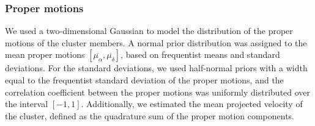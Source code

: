 \documentclass{aa}
\begin{document}
\subsubsection{Proper motions}
We used a two-dimensional Gaussian to model the distribution of the proper motions of the cluster members. A normal prior distribution was assigned to the mean proper motions $\left[\overline{\mu_\alpha},\overline{\mu_\delta}\right]$, based on frequentist means and standard deviations. For the standard deviations, we used half-normal priors with a width equal to the frequentist standard deviation of the proper motions, and the correlation coefficient between the proper motions was uniformly distributed over the interval $[-1, 1]$. Additionally, we estimated the mean projected velocity of the cluster, defined as the quadrature sum of the proper motion components.
\begin{table}
	\caption{Summary of derived parameters for NGC 6383, focusing on sources with at least a 60\% membership probability. Key measurements include distances assessed through parallax and distance modulus, mean age and stellar formation age, metallicity, and total stellar membership. The table also includes structural parameters such as core and tidal radii, absorption, and galactocentric distance, complemented by dynamic properties like proper motions, radial velocities, concentration parameters, specific radius measurements, the number of identified young stellar objects (YSOs), the fraction of YSOs, and the minimum segregation time.}
	\centering
\end{table}
\end{document}
